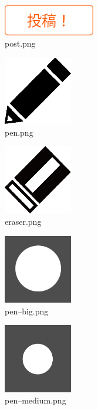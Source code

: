 \documentclass[a4j,titlepage]{jsarticle}
\begin{document}
\begin{figure}[H]
  \centering
  \includegraphics[width=4cm]{../public/image/post.png}
  \caption{post.png}
  \label{fig:post}
\end{figure}

\begin{figure}[H]
  \centering
  \includegraphics[width=3cm]{../public/image/pen.png}
  \caption{pen.png}
  \label{fig:pen}
\end{figure}

\begin{figure}[H]
  \centering
  \includegraphics[width=3cm]{../public/image/eraser.png}
  \caption{eraser.png}
  \label{fig:eraser}
\end{figure}

\begin{figure}[H]
  \centering
  \includegraphics[width=3cm]{../public/image/pen-big.png}
  \caption{pen--big.png}
  \label{fig:penbig}
\end{figure}

\begin{figure}[H]
  \centering
  \includegraphics[width=3cm]{../public/image/pen-medium.png}
  \caption{pen--medium.png}
  \label{fig:penmedium}
\end{figure}
\end{document}
